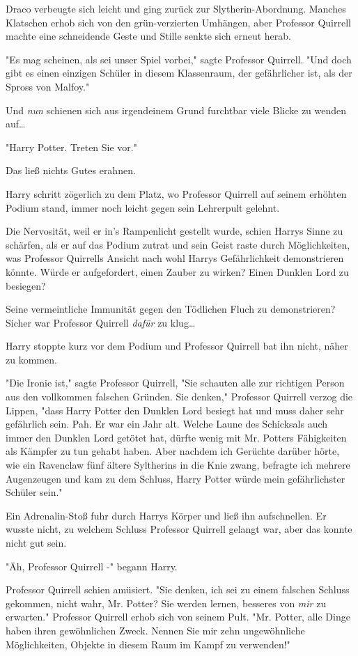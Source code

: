 {Draco verbeugte sich leicht und ging zurück zur Slytherin-Abordnung. Manches Klatschen erhob sich von den grün-verzierten Umhängen, aber Professor Quirrell machte eine schneidende Geste und Stille senkte sich erneut herab.

"Es mag scheinen, als sei unser Spiel vorbei," sagte Professor Quirrell. "Und doch gibt es einen einzigen Schüler in diesem Klassenraum, der gefährlicher ist, als der Spross von Malfoy."

Und \emph{nun} schienen sich aus irgendeinem Grund furchtbar viele Blicke zu wenden auf…

"Harry Potter. Treten Sie vor."

Das ließ nichts Gutes erahnen.

Harry schritt zögerlich zu dem Platz, wo Professor Quirrell auf seinem erhöhten Podium stand, immer noch leicht gegen sein Lehrerpult gelehnt.

Die Nervosität, weil er in's Rampenlicht gestellt wurde, schien Harrys Sinne zu schärfen, als er auf das Podium zutrat und sein Geist raste durch Möglichkeiten, was Professor Quirrells Ansicht nach wohl Harrys Gefährlichkeit demonstrieren könnte. Würde er aufgefordert, einen Zauber zu wirken? Einen Dunklen Lord zu besiegen?

Seine vermeintliche Immunität gegen den Tödlichen Fluch zu demonstrieren? Sicher war Professor Quirrell \emph{dafür} zu klug…

Harry stoppte kurz vor dem Podium und Professor Quirrell bat ihn nicht, näher zu kommen.

"Die Ironie ist," sagte Professor Quirrell, "Sie schauten alle zur richtigen Person aus den vollkommen falschen Gründen. Sie denken," Professor Quirrell verzog die Lippen, "dass Harry Potter den Dunklen Lord besiegt hat und muss daher sehr gefährlich sein. Pah. Er war ein Jahr alt. Welche Laune des Schicksals auch immer den Dunklen Lord getötet hat, dürfte wenig mit Mr. Potters Fähigkeiten als Kämpfer zu tun gehabt haben. Aber nachdem ich Gerüchte darüber hörte, wie ein Ravenclaw fünf ältere Syltherins in die Knie zwang, befragte ich mehrere Augenzeugen und kam zu dem Schluss, Harry Potter würde mein gefährlichster Schüler sein."

Ein Adrenalin-Stoß fuhr durch Harrys Körper und ließ ihn aufschnellen. Er wusste nicht, zu welchem Schluss Professor Quirrell gelangt war, aber das konnte nicht gut sein.

"Äh, Professor Quirrell -" begann Harry.

Professor Quirrell schien amüsiert. "Sie denken, ich sei zu einem falschen Schluss gekommen, nicht wahr, Mr. Potter? Sie werden lernen, besseres von \emph{mir} zu erwarten." Professor Quirrell erhob sich von seinem Pult. "Mr. Potter, alle Dinge haben ihren gewöhnlichen Zweck. Nennen Sie mir zehn ungewöhnliche Möglichkeiten, Objekte in diesem Raum im Kampf zu verwenden!"

}
